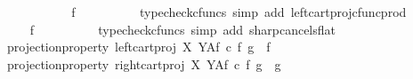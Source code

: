 \begin{isabellebody}
\ \ \ \ \ \ \isamarkupfalse%
\ \isamarkupfalse%
\ {\isachardoublequoteopen}{\isachardot}{\kern0pt}{\isachardot}{\kern0pt}{\isachardot}{\kern0pt}\ {\isacharequal}{\kern0pt}\ f\isactrlsup {\isasymflat}\isactrlsup {\isasymsharp}{\isachardoublequoteclose}\isanewline
\ \ \ \ \ \ \ \ \isamarkupfalse%
\ {\isacharparenleft}{\kern0pt}typecheck{\isacharunderscore}{\kern0pt}cfuncs{\isacharcomma}{\kern0pt}\ simp\ add{\isacharcolon}{\kern0pt}\ left{\isacharunderscore}{\kern0pt}cart{\isacharunderscore}{\kern0pt}proj{\isacharunderscore}{\kern0pt}cfunc{\isacharunderscore}{\kern0pt}prod{\isacharparenright}{\kern0pt}\isanewline
\ \ \ \ \ \ \isamarkupfalse%
\ \isamarkupfalse%
\ {\isachardoublequoteopen}{\isachardot}{\kern0pt}{\isachardot}{\kern0pt}{\isachardot}{\kern0pt}\ {\isacharequal}{\kern0pt}\ f{\isachardoublequoteclose}\isanewline
\ \ \ \ \ \ \ \ \isamarkupfalse%
\ {\isacharparenleft}{\kern0pt}typecheck{\isacharunderscore}{\kern0pt}cfuncs{\isacharcomma}{\kern0pt}\ simp\ add{\isacharcolon}{\kern0pt}\ sharp{\isacharunderscore}{\kern0pt}cancels{\isacharunderscore}{\kern0pt}flat{\isacharparenright}{\kern0pt}\isanewline
\ \ \ \ \ \ \isamarkupfalse%
\ \isamarkupfalse%
\ projection{\isacharunderscore}{\kern0pt}property{}{\isacharcolon}{\kern0pt}\ {\isachardoublequoteopen}{\isacharparenleft}{\kern0pt}{\isacharparenleft}{\kern0pt}left{\isacharunderscore}{\kern0pt}cart{\isacharunderscore}{\kern0pt}proj\ X\ Y{\isacharparenright}{\kern0pt}\isactrlbsup A\isactrlesup \isactrlsub f{\isacharparenright}{\kern0pt}\ {\isasymcirc}\isactrlsub c\ {\isasymlangle}f\isactrlsup {\isasymflat}\ {\isacharcomma}{\kern0pt}g\isactrlsup {\isasymflat}{\isasymrangle}\isactrlsup {\isasymsharp}\ {\isacharequal}{\kern0pt}\ f{\isachardoublequoteclose}\isacommand{{\isachardot}{\kern0pt}}\isamarkupfalse%
\isanewline
\ \ \ \ \ \ \isamarkupfalse%
\ projection{\isacharunderscore}{\kern0pt}property{}{\isacharcolon}{\kern0pt}\ {\isachardoublequoteopen}{\isacharparenleft}{\kern0pt}{\isacharparenleft}{\kern0pt}right{\isacharunderscore}{\kern0pt}cart{\isacharunderscore}{\kern0pt}proj\ X\ Y{\isacharparenright}{\kern0pt}\isactrlbsup A\isactrlesup \isactrlsub f{\isacharparenright}{\kern0pt}\ {\isasymcirc}\isactrlsub c\ {\isasymlangle}f\isactrlsup {\isasymflat}\ {\isacharcomma}{\kern0pt}g\isactrlsup {\isasymflat}{\isasymrangle}\isactrlsup {\isasymsharp}\ {\isacharequal}{\kern0pt}\ g{\isachardoublequoteclose}\isanewline
\ \ \ \ \ \ \ \ \isamarkupfalse%

\end{isabellebody}
